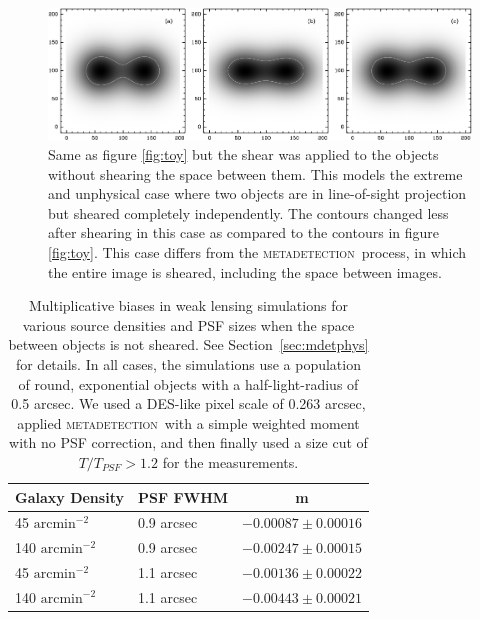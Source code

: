 \documentclass[fleqn,useAMS,usenatbib]{mnras}
\newcommand{\mdet}{\textsc{metadetection}}
\begin{document}
\begin{figure}
  \includegraphics[width=\textwidth]{figures/toy-no-full-scene.png}

    \caption{Same as figure \ref{fig:toy} but the shear was applied to the
    objects without shearing the space between them. This models the extreme
    and unphysical case where two objects are in line-of-sight projection but
    sheared completely independently.  The contours changed less after shearing
    in this case as compared to the contours in figure \ref{fig:toy}.  This
    case differs from the \mdet\ process, in which the entire image is sheared,
    including the space between images.  \label{fig:toynoscene} }

\end{figure}


\begin{table}
  \centering
  \caption{
    Multiplicative biases in weak lensing simulations for various source
    densities and PSF sizes when the space between objects is not sheared. See
    Section~\ref{sec:mdetphys} for details. In all cases, the simulations use a
    population of round, exponential objects with a half-light-radius of 0.5
    arcsec. We used a DES-like pixel scale of 0.263 arcsec, applied \mdet\
    with a simple weighted moment with no PSF correction, and then finally
    used a size cut of $T/T_{PSF} > 1.2$ for the measurements.}
  \label{tab:nssres}
  \begin{tabular}{llc}
    \hline
    Galaxy Density & PSF FWHM & m \\
    \hline
    45 $\mathrm{arcmin}^{-2}$  & 0.9 arcsec & $-0.00087 \pm 0.00016$ \\
    140 $\mathrm{arcmin}^{-2}$ & 0.9 arcsec & $-0.00247 \pm 0.00015$ \\
    45 $\mathrm{arcmin}^{-2}$  & 1.1 arcsec & $-0.00136 \pm 0.00022$ \\
    140 $\mathrm{arcmin}^{-2}$ & 1.1 arcsec & $-0.00443 \pm 0.00021$ \\
    \hline
  \end{tabular}
\end{table}
\end{document}
